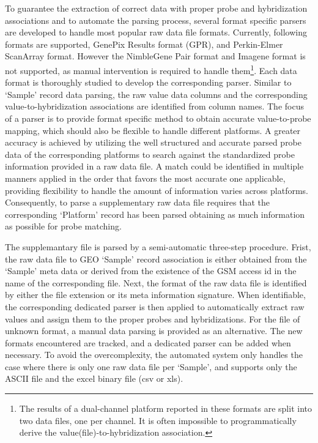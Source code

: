 To guarantee the extraction of correct data with proper probe and
hybridization associations and to automate the parsing process, several format
specific parsers are developed to handle most popular raw data file formats.
%
Currently, following formats are supported, GenePix Results format (GPR),
and Perkin-Elmer ScanArray format.  
However the NimbleGene Pair format and Imagene format is not supported, as
manual intervention is required to handle them\footnote{The results of a
  dual-channel platform reported in these formats are split into two data
  files, one per channel.  It is often impossible to programmatically derive
  the value(file)-to-hybridization association.}.
%
Each data format is thoroughly studied to develop the corresponding parser.
%
Similar to `Sample' record data parsing, the raw value data columns and the
corresponding value-to-hybridization associations are identified from column
names.
%
The focus of a parser is to provide format specific method to obtain accurate
value-to-probe mapping, which should also be flexible to handle different
platforms.
%
A greater accuracy is achieved by utilizing the well structured and accurate
parsed probe data of the corresponding platforms to search against the
standardized probe information provided in a raw data file.
%
A match could be identified in multiple manners applied in the order that
favors the most accurate one applicable, providing flexibility to handle the
amount of information varies across platforms.
%
Consequently, to parse a supplementary raw data file requires that the
corresponding `Platform' record has been parsed obtaining as much information
as possible for probe matching.


The supplemantary file is parsed by a semi-automatic three-step procedure.
%
Frist, the raw data file to GEO `Sample' record association is either obtained
from the `Sample' meta data or derived from the existence of the GSM access id
in the name of the corresponding file.
%
Next, the format of the raw data file is identified by either the file
extension or its meta information signature.
%
When identifiable, the corresponding dedicated parser is then applied to
automatically extract raw values and assign them to the proper probes and
hybridizations.
%
For the file of unknown format, a manual data parsing is provided as an
alternative.
%
The new formats encountered are tracked, and a dedicated parser can be added
when necessary.
%
%
To avoid the overcomplexity, the automated system only handles the case
where there is only one raw data file per `Sample', and supports only the
ASCII file and the excel binary file (csv or xls).

